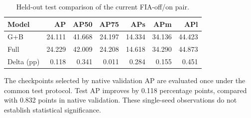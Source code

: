 \begin{table}[t]
\centering
\small
\setlength{\tabcolsep}{4pt}
\caption{Held-out test comparison of the current FIA-off/on pair.}
\label{tab:selected-s1}
\begin{tabular}{lrrrrrr}
\toprule
Model & AP & AP50 & AP75 & APs & APm & APl \\
\midrule
G+B & 24.111 & 41.668 & 24.197 & 14.334 & 34.136 & 44.423 \\
Full & 24.229 & 42.009 & 24.208 & 14.618 & 34.290 & 44.873 \\
Delta (pp) & 0.118 & 0.341 & 0.011 & 0.284 & 0.155 & 0.451 \\
\bottomrule
\end{tabular}
\par\smallskip
\begin{minipage}{0.97\textwidth}\footnotesize The checkpoints selected by native validation AP are evaluated once under the common test protocol. Test AP improves by 0.118 percentage points, compared with 0.832 points in native validation. These single-seed observations do not establish statistical significance.\end{minipage}
\par\medskip
\end{table}
